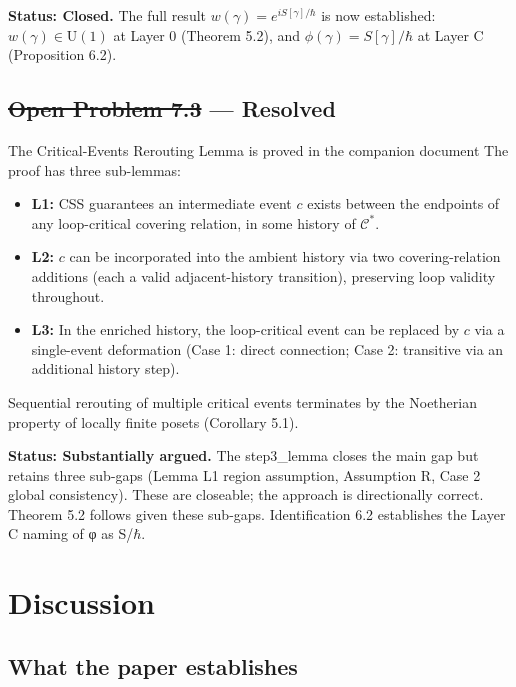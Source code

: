 \documentclass[11pt]{article}
\providecommand{\tightlist}{\setlength{\itemsep}{0pt}\setlength{\parskip}{0pt}}
\theoremstyle{definition}
\theoremstyle{remark}
\begin{document}
\textbf{Status: Closed.} The full result
\(w(\gamma) = e^{iS[\gamma]/\hbar}\) is now established:
\(w(\gamma) \in \mathrm{U}(1)\) at Layer 0 (Theorem 5.2), and
\(\phi(\gamma) = S[\gamma]/\hbar\) at Layer C (Proposition 6.2).

\medskip

\subsection{\texorpdfstring{\st{Open Problem 7.3} ---
Resolved}{Open Problem 7.3 --- Resolved}}\label{open-problem-7.3-resolved}

The Critical-Events Rerouting Lemma is proved in the companion document
The proof has three sub-lemmas:

\begin{itemize}
\tightlist
\item
  \textbf{L1:} CSS guarantees an intermediate event \(c\) exists between
  the endpoints of any loop-critical covering relation, in some history
  of \(\mathcal{C}^{\ast}\).
\item
  \textbf{L2:} \(c\) can be incorporated into the ambient history via
  two covering-relation additions (each a valid adjacent-history
  transition), preserving loop validity throughout.
\item
  \textbf{L3:} In the enriched history, the loop-critical event can be
  replaced by \(c\) via a single-event deformation (Case 1: direct
  connection; Case 2: transitive via an additional history step).
\end{itemize}

Sequential rerouting of multiple critical events terminates by the
Noetherian property of locally finite posets (Corollary 5.1).

\textbf{Status: Substantially argued.} The step3\_lemma closes the main
gap but retains three sub-gaps (Lemma L1 region assumption, Assumption
R, Case 2 global consistency). These are closeable; the approach is
directionally correct. Theorem 5.2 follows given these sub-gaps.
Identification 6.2 establishes the Layer C naming of φ as S/\(\hbar\).

\medskip

\section{Discussion}\label{discussion}

\subsection{What the paper
establishes}\label{what-the-paper-establishes}
\end{document}
